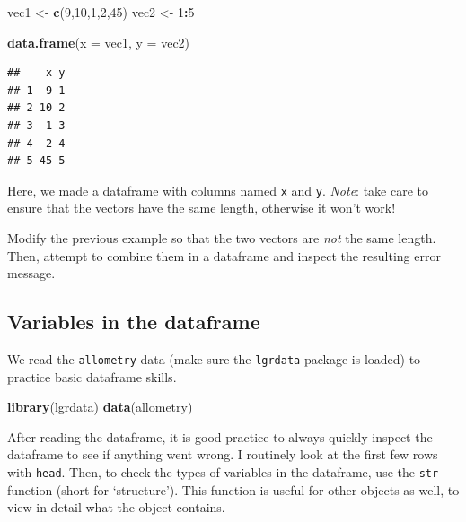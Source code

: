 \documentclass[]{book}
\newenvironment{Shaded}{\begin{snugshade}}{\end{snugshade}}
\newcommand{\DataTypeTok}[1]{\textcolor[rgb]{0.13,0.29,0.53}{#1}}
\newcommand{\DecValTok}[1]{\textcolor[rgb]{0.00,0.00,0.81}{#1}}
\newcommand{\KeywordTok}[1]{\textcolor[rgb]{0.13,0.29,0.53}{\textbf{#1}}}
\newcommand{\NormalTok}[1]{#1}
\newcommand{\OperatorTok}[1]{\textcolor[rgb]{0.81,0.36,0.00}{\textbf{#1}}}
\newcommand{\StringTok}[1]{\textcolor[rgb]{0.31,0.60,0.02}{#1}}
\let\BeginKnitrBlock\begin \let\EndKnitrBlock\end
\begin{document}
\begin{Shaded}
\begin{Highlighting}[]
\NormalTok{vec1 <-}\StringTok{ }\KeywordTok{c}\NormalTok{(}\DecValTok{9}\NormalTok{,}\DecValTok{10}\NormalTok{,}\DecValTok{1}\NormalTok{,}\DecValTok{2}\NormalTok{,}\DecValTok{45}\NormalTok{)}
\NormalTok{vec2 <-}\StringTok{ }\DecValTok{1}\OperatorTok{:}\DecValTok{5}

\KeywordTok{data.frame}\NormalTok{(}\DataTypeTok{x =}\NormalTok{ vec1, }\DataTypeTok{y =}\NormalTok{ vec2)}
\end{Highlighting}
\end{Shaded}

\begin{verbatim}
##    x y
## 1  9 1
## 2 10 2
## 3  1 3
## 4  2 4
## 5 45 5
\end{verbatim}

Here, we made a dataframe with columns named \texttt{x} and \texttt{y}. \emph{Note}: take care to ensure that the vectors have the same length, otherwise it won't work!

\BeginKnitrBlock{rmdtry}
Modify the previous example so that the two vectors are \emph{not} the same length. Then, attempt to combine them in a dataframe and inspect the resulting error message.
\EndKnitrBlock{rmdtry}

\hypertarget{variables-in-the-dataframe}{%
\subsection{Variables in the dataframe}\label{variables-in-the-dataframe}}

We read the \texttt{allometry} data (make sure the \texttt{lgrdata} package is loaded) to practice basic dataframe skills.

\begin{Shaded}
\begin{Highlighting}[]
\KeywordTok{library}\NormalTok{(lgrdata)}
\KeywordTok{data}\NormalTok{(allometry)}
\end{Highlighting}
\end{Shaded}

After reading the dataframe, it is good practice to always quickly inspect the dataframe to see if anything went wrong. I routinely look at the first few rows with \texttt{head}. Then, to check the types of variables in the dataframe, use the \texttt{str} function (short for `structure'). This function is useful for other objects as well, to view in detail what the object contains.
\end{document}
